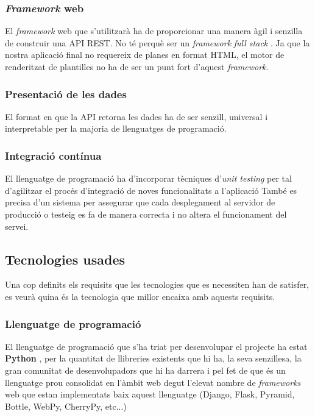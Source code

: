 	
	\subsubsection{\emph{Framework} web}
	El \emph{framework} web que s'utilitzarà ha de proporcionar una manera àgil i senzilla de construir una \ac{API} \ac{REST}. No té perquè ser un \emph{framework} \emph{full stack} \cite{web_framework}. Ja que la nostra aplicació final no requereix de planes en format \ac{HTML}, el motor de renderitzat de plantilles no ha de ser un punt fort d'aquest \emph{framework}.
	
	\subsubsection{Presentació de les dades}
	El format en que la \ac{API} retorna les dades ha de ser senzill, universal i interpretable per la majoria de llenguatges de programació.

	\subsubsection{Integració contínua}
	El llenguatge de programació ha d'incorporar tècniques d'\emph{unit testing} per tal d'agilitzar el procés d'integració de noves funcionalitats a l'aplicació També es precisa d'un sistema per assegurar que cada desplegament al servidor de producció o testeig es fa de manera correcta i no altera el funcionament del servei.

\subsection{Tecnologies usades}
Una cop definits els requisits que les tecnologies que es necessiten han de satisfer, es veurà quina és la tecnologia que millor encaixa amb aquests requisits.

	\subsubsection{Llenguatge de programació}
	El llenguatge de programació que s'ha triat per desenvolupar el projecte ha estat \textbf{Python} \cite{python}, per la quantitat de llibreries existents que hi ha, la seva senzillesa, la gran comunitat de desenvolupadors que hi ha darrera i pel fet de que és un llenguatge prou consolidat en l'àmbit web degut l'elevat nombre de \emph{frameworks} web que estan implementats baix aquest llenguatge (Django, Flask, Pyramid, Bottle, WebPy, CherryPy, etc...)

